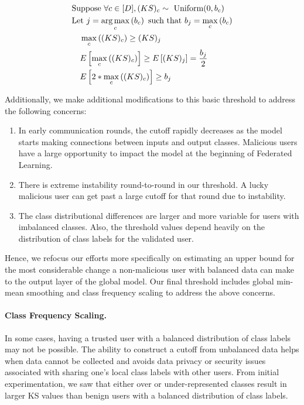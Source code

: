 \documentclass{article} %
\begin{document}
\begin{align}
    & \textrm{Suppose } \forall c \in \mathopen[ D \mathclose], (KS)_c \sim \textrm{ Uniform}(0, b_c) \nonumber \\
    & \textrm{Let } j = \operatorname*{arg\,max}_c \left( b_c \right) \textrm{ such that } b_j = \max_c \left( b_c \right) \nonumber \\
    & \quad \max_c \left( (KS)_c \right) \geq (KS)_j \nonumber \\
    & \quad E \left[ \max_c \left( (KS)_c \right) \right] \geq E \left[ (KS)_j \right] = \dfrac{b_j}{2} \nonumber \\
    & \quad E \left[ 2 * \max_c \left( (KS)_c \right) \right] \geq b_j \label{eq:geq_bound} 
\end{align}

Additionally, we make additional modifications to this basic threshold to address the following concerns:
\begin{enumerate}
    \item In early communication rounds, the cutoff rapidly decreases as the model starts making connections between inputs and output classes. Malicious users have a large opportunity to impact the model at the beginning of Federated Learning.
    \item There is extreme instability round-to-round in our threshold. A lucky malicious user can get past a large cutoff for that round due to instability.
    \item The class distributional differences are larger and more variable for users with imbalanced classes. Also, the threshold values depend heavily on the distribution of class labels for the validated user.
\end{enumerate}

Hence, we refocus our efforts more specifically on estimating an upper bound for the most considerable change a non-malicious user with balanced data can make to the output layer of the global model. Our final threshold includes global min-mean smoothing and class frequency scaling to address the above concerns.

%
\paragraph{Class Frequency Scaling.} In some cases, having a trusted user with a balanced distribution of class labels may not be possible. The ability to construct a cutoff from unbalanced data helps when data cannot be collected and avoids data privacy or security issues associated with sharing one's local class labels with other users. From initial experimentation, we saw that either over or under-represented classes result in larger KS values than benign users with a balanced distribution of class labels. 
\end{document}
